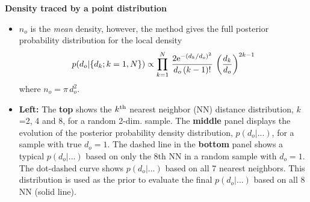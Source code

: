 \documentclass[letterpaper,landscape]{slides}
\begin{document}
\begin{slide}
{\begin{minipage}[t]{19cm}
\centerline{\color{blue} \bf Density traced by a point distribution}
\begin{itemize}
\item $n_o$ is the {\it mean} density, however, the method gives the full 
posterior probability distribution
for the local density
\begin{eqnarray}
  p(d_o|\{d_k; k=1,N\}) \propto 
    \prod_{k=1}^{N} \, {2 {\rm e}^{-(d_k/d_o)^2} \over d_o\, (k-1)!} \,
    \left({d_k \over d_o}\right)^{2k-1} \nonumber
\end{eqnarray}
where $n_o=\pi \, d_o^2$.
\item {\bf Left:} The {\bf top} shows the $k^{\rm th}$ nearest neighbor (NN) 
distance distribution, $k$=2, 4 and 8, for a random 2-dim. sample. 
The {\bf middle} panel displays the evolution of the posterior
probability density distribution, $p(d_o|...)$, for a sample with true $d_o=1$.
The dashed line in the {\bf bottom} panel shows a typical $p(d_o|...)$
based on only the 8th NN in a random sample with $d_o=1$. The dot-dashed curve 
shows $p(d_o|...)$ based on all 7 nearest neighbors. This distribution is 
used as the prior to evaluate the final $p(d_o|...)$ based on all 8 NN 
(solid line).
\end{itemize}     

\end{minipage}}
\vfill 
\end{slide}
\end{document}
